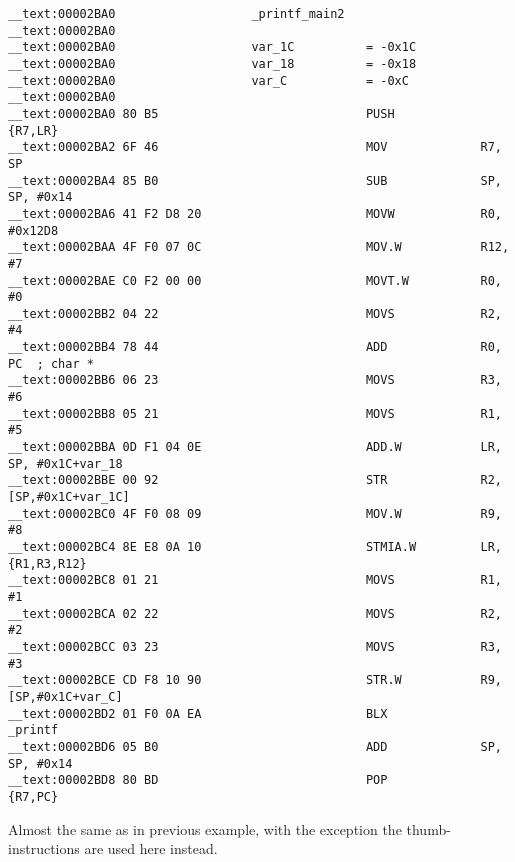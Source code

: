 \begin{lstlisting}
__text:00002BA0                   _printf_main2
__text:00002BA0
__text:00002BA0                   var_1C          = -0x1C
__text:00002BA0                   var_18          = -0x18
__text:00002BA0                   var_C           = -0xC
__text:00002BA0
__text:00002BA0 80 B5                             PUSH            {R7,LR}
__text:00002BA2 6F 46                             MOV             R7, SP
__text:00002BA4 85 B0                             SUB             SP, SP, #0x14
__text:00002BA6 41 F2 D8 20                       MOVW            R0, #0x12D8
__text:00002BAA 4F F0 07 0C                       MOV.W           R12, #7
__text:00002BAE C0 F2 00 00                       MOVT.W          R0, #0
__text:00002BB2 04 22                             MOVS            R2, #4
__text:00002BB4 78 44                             ADD             R0, PC  ; char *
__text:00002BB6 06 23                             MOVS            R3, #6
__text:00002BB8 05 21                             MOVS            R1, #5
__text:00002BBA 0D F1 04 0E                       ADD.W           LR, SP, #0x1C+var_18
__text:00002BBE 00 92                             STR             R2, [SP,#0x1C+var_1C]
__text:00002BC0 4F F0 08 09                       MOV.W           R9, #8
__text:00002BC4 8E E8 0A 10                       STMIA.W         LR, {R1,R3,R12}
__text:00002BC8 01 21                             MOVS            R1, #1
__text:00002BCA 02 22                             MOVS            R2, #2
__text:00002BCC 03 23                             MOVS            R3, #3
__text:00002BCE CD F8 10 90                       STR.W           R9, [SP,#0x1C+var_C]
__text:00002BD2 01 F0 0A EA                       BLX             _printf
__text:00002BD6 05 B0                             ADD             SP, SP, #0x14
__text:00002BD8 80 BD                             POP             {R7,PC}
\end{lstlisting}

{Almost the same as in previous example,
with the exception the thumb-instructions are used here instead}.

